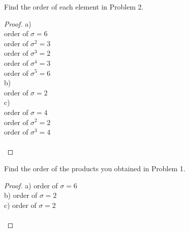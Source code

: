 \documentclass[12pt]{article}
\newenvironment{problem}[2][Problem]{\begin{trivlist}
\item[\hskip \labelsep {\bfseries #1}\hskip \labelsep {\bfseries #2.}]}{\end{trivlist}}
\begin{document}
\begin{problem}{3.1.4}
Find the order of each element in Problem 2.
\end{problem}

\begin{proof} 
\bigskip
a) \\
 order of $\sigma = 6$ \\ 
order of $\sigma^2 =3$ \\
order of $\sigma^3 = 2$ \\
order of $\sigma^4 = 3$ \\
order of $\sigma^5 = 6$ \\
b) \\
order of $\sigma = 2$ \\
c) \\
order of $\sigma = 4$ \\ 
order of $\sigma^2 =2$ \\
order of $\sigma^3 = 4$ \\ \\
\end{proof}

\begin{problem}{3.1.5}
Find the order of the products you obtained in Problem 1.
\end{problem}

\begin{proof}
\bigskip
a) order of $\sigma = 6$ \\ 
b) order of $\sigma = 2$ \\
c) order of $\sigma = 2$ \\ \\ 
\end{proof}

\end{document}
